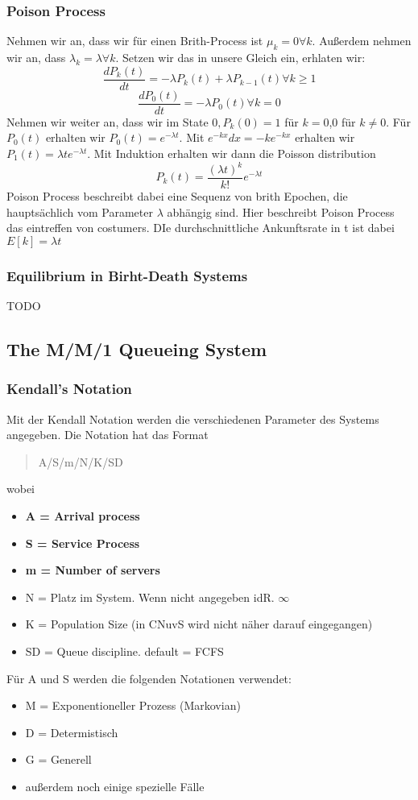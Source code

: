 		\subsubsection{Poison Process}
			Nehmen wir an, dass wir für einen Brith-Process ist $\mu_k=0\forall k$. Außerdem nehmen wir an, dass $\lambda_k = \lambda \forall k$. Setzen wir das in unsere Gleich ein, erhlaten wir: 
			$$
				\frac{dP_k(t)}{dt} = - \lambda P_k(t)+\lambda P_{k-1}(t) \forall	k\ge1
			$$
			$$
				\frac{dP_0(t)}{dt} = - \lambda P_0(t) 			\forall			k=0
			$$
			Nehmen wir weiter an, dass wir im State $0,P_k(0)=1$ für $k=0$,$0$ für $k \ne 0$. Für $P_0(t)$ erhalten wir $P_0(t)=e^{-\lambda t}$. Mit $e^{-kx}dx = -k e^{-kx}$ erhalten wir $P_1(t) = \lambda te^{-\lambda t}$. Mit Induktion erhalten wir dann die Poisson distribution
			$$
				P_k(t) = \frac{(\lambda t)^k}{k!}e^{-\lambda t}
			$$
			Poison Process beschreibt dabei eine Sequenz von brith Epochen, die hauptsächlich vom Parameter $\lambda$ abhängig sind. Hier beschreibt Poison Process das eintreffen von costumers. DIe durchschnittliche Ankunftsrate in t ist dabei $E[k] = \lambda t$

		\subsubsection{Equilibrium in Birht-Death Systems}
			TODO 

	\subsection{The M/M/1 Queueing System}
		\subsubsection{Kendall's Notation}
			Mit der Kendall Notation werden die verschiedenen Parameter des Systems angegeben. Die Notation hat das Format
			\begin{quote}
				A/S/m/N/K/SD 
			\end{quote}
			wobei 
			\begin{itemize}
				\item \textbf{A = Arrival process}
				\item \textbf{S = Service Process}
				\item \textbf{m = Number of servers}
				\item N = Platz im System. Wenn nicht angegeben idR. $\infty$
				\item K = Population Size  (in CNuvS wird nicht näher darauf eingegangen)
				\item SD = Queue discipline. default = FCFS
			\end{itemize}
			Für A und S werden die folgenden Notationen verwendet:
			\begin{itemize}
				\item M = Exponentioneller Prozess (Markovian)
				\item D = Determistisch
				\item G = Generell
				\item außerdem noch einige spezielle Fälle
			\end{itemize}

